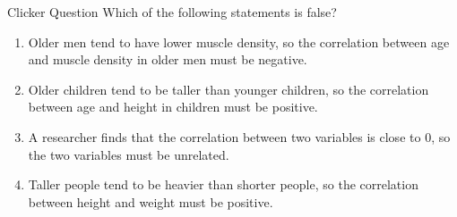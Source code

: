 \documentclass{beamer}
\begin{document}
\begin{frame}{Clicker Question}
	Which of the following statements is false?
	\begin{enumerate}[label=(\alph*)]
		\item Older men tend to have lower muscle density, so the correlation between age and muscle density in older men must be negative.
		\item Older children tend to be taller than younger children, so the correlation between age and height in children must be positive.
		\item A researcher finds that the correlation between two variables is close to 0, so the two variables must be unrelated.%
		\item Taller people tend to be heavier than shorter people, so the correlation between height and weight must be positive.
	\end{enumerate}
\end{frame}
\end{document}
